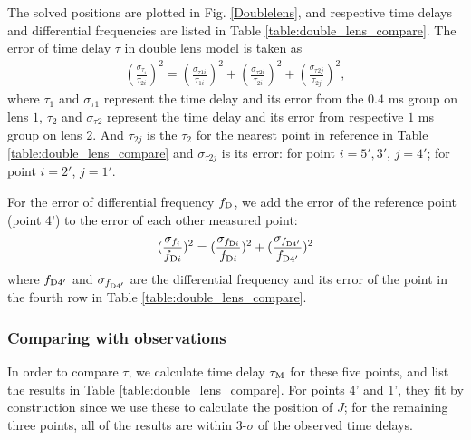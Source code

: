 \documentclass[useAMS,usenatbib]{mn2e}
\begin{document}
The solved positions are plotted in Fig. \ref{Doublelens}, and
respective time delays and differential frequencies are listed in
Table \ref{table:double_lens_compare}. The error of time delay $\tau$
in double lens model is taken as
\begin{equation}
\begin{aligned}
(\frac{\sigma_{\tau_i}}{\tau_{2i}})^2 = (\frac{\sigma_{\tau1i}}{\tau_{1i}})^2+(\frac{\sigma_{\tau2i}}{\tau_{2i}})^2 + (\frac{\sigma_{\tau2j}}{\tau_{2j}})^2,
\end{aligned}
\end{equation}
where $\tau_1$ and $\sigma_{\tau1}$ represent the time delay and its
error from the $0.4$ ms group on lens $1$, $\tau_2$ and
$\sigma_{\tau2}$ represent the time delay and its error from
respective $1$ ms group on lens 2. And $\tau_{2j}$ is the $\tau_2$ for
the nearest point in reference in Table
\ref{table:double_lens_compare} and $\sigma_{\tau2j}$ is its error:
for point $i=5',3'$, $j=4'$; for point $i=2'$, $j=1'$.

For the error of differential frequency $f_{\rm D}$, we add the error of the reference point (point 4') to the error of each other measured point:
\begin{equation}
\begin{aligned}
(\frac{\sigma_{f_i}}{f_{{\rm D}i}})^2=(\frac{\sigma_{f_{{\rm D}i}}}{f_{{\rm D}i}})^2+(\frac{\sigma_{f_{{\rm D}4'}}}{f_{{\rm D}4'}})^2
\end{aligned}
\end{equation}
where $f_{{\rm D}4'}$ and $\sigma_{f_{{\rm D}4'}}$ are the differential frequency
and its error of the point in the fourth row in Table
\ref{table:double_lens_compare}.

\subsubsection{Comparing with observations}
In order to compare $\tau$, we calculate time delay $\tau_{\rm M}$ for these five
points, and list the results in Table
\ref{table:double_lens_compare}. For points 4' and 1', they fit by
construction since we use these to calculate the position of $J$; for the remaining three points, all of the results are within 3-$\sigma$ of the observed time delays.
\end{document}
